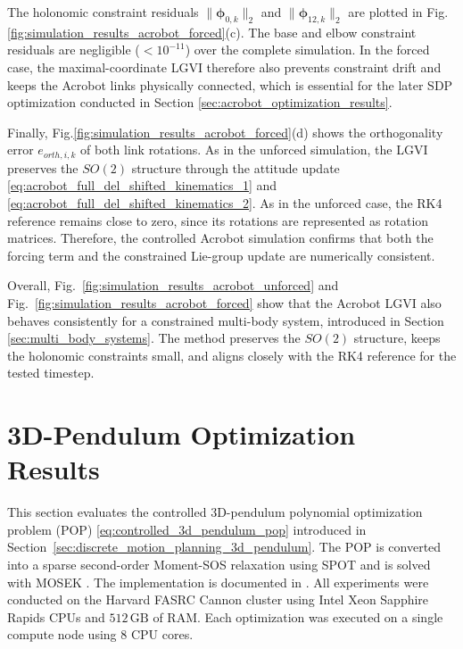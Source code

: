 The holonomic constraint residuals $\|\bm{\phi}_{0,k}\|_2$ and $\|\bm{\phi}_{12,k}\|_2$ are plotted in Fig.\ref{fig:simulation_results_acrobot_forced}(c). The base and elbow constraint residuals are negligible ($< 10^{-11}$) over the complete simulation. In the forced case, the maximal-coordinate LGVI therefore also prevents constraint drift and keeps the Acrobot links physically connected, which is essential for the later SDP optimization conducted in Section \ref{sec:acrobot_optimization_results}.

Finally, Fig.\ref{fig:simulation_results_acrobot_forced}(d) shows the orthogonality error $e_{orth,i,k}$ of both link rotations. As in the unforced simulation, the LGVI preserves the $SO(2)$ structure through the attitude update \eqref{eq:acrobot_full_del_shifted_kinematics_1} and \eqref{eq:acrobot_full_del_shifted_kinematics_2}. As in the unforced case, the RK4 reference remains close to zero, since its rotations are represented as rotation matrices. Therefore, the controlled Acrobot simulation confirms that both the forcing term and the constrained Lie-group update are numerically consistent.

Overall, Fig.~\ref{fig:simulation_results_acrobot_unforced} and
Fig.~\ref{fig:simulation_results_acrobot_forced} show that the Acrobot LGVI also behaves
consistently for a constrained multi-body system, introduced in Section \ref{sec:multi_body_systems}. The method preserves the
\(SO(2)\) structure, keeps the holonomic constraints small, and aligns closely with
the RK4 reference for the tested timestep.


\section{3D-Pendulum Optimization Results}
\label{sec:3d_pendulum_optimization_results}

This section evaluates the controlled 3D-pendulum polynomial optimization
problem (POP) \eqref{eq:controlled_3d_pendulum_pop} introduced in
Section~\ref{sec:discrete_motion_planning_3d_pendulum}. The POP is converted
into a sparse second-order Moment-SOS relaxation using SPOT and is solved with
MOSEK \cite{Kang_2025Global}. The implementation is documented in
\cite{Elshani2026CTO_GitHub}. All experiments were conducted 
on the Harvard FASRC Cannon cluster using Intel Xeon Sapphire Rapids CPUs and 
\(512\,\mathrm{GB}\) of RAM. Each optimization was executed on a 
single compute node using 8 CPU cores.

